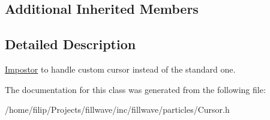\subsection*{Additional Inherited Members}


\subsection{Detailed Description}
\hyperlink{classfillwave_1_1particles_1_1Impostor}{Impostor} to handle custom cursor instead of the standard one. 

The documentation for this class was generated from the following file\+:\begin{DoxyCompactItemize}
\item 
/home/filip/\+Projects/fillwave/inc/fillwave/particles/Cursor.\+h\end{DoxyCompactItemize}
